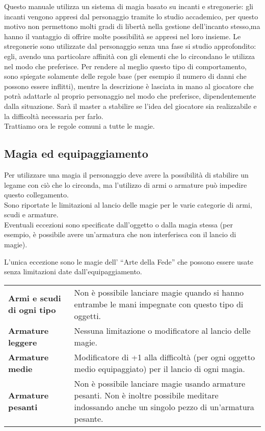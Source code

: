 \documentclass[../manuale_main.tex]{subfiles}
\begin{document}
Questo manuale utilizza un sistema di magia basato su incanti e stregonerie: gli incanti vengono appresi dal personaggio tramite lo studio accademico, per questo motivo non permettono molti gradi di libertà nella gestione dell'incanto stesso,ma hanno il vantaggio di offrire molte possibilità se appresi nel loro insieme. 
Le stregonerie sono utilizzate dal personaggio senza una fase si studio approfondito: egli, avendo una particolare affinità con gli elementi che lo circondano le utilizza nel modo che preferisce. Per rendere al meglio questo tipo di comportamento, sono spiegate solamente delle regole base (per esempio il numero di danni che possono essere inflitti), mentre la descrizione è lasciata in mano al giocatore che potrà adattarle al proprio personaggio nel modo che preferisce, dipendentemente dalla situazione. Sarà il master a stabilire se l'idea del giocatore sia realizzabile e la difficoltà necessaria per farlo.\\
Trattiamo ora le regole comuni a tutte le magie.\\


\subsection{Magia ed equipaggiamento}
Per utilizzare una magia il personaggio deve avere la possibilità di stabilire un legame con ciò che lo circonda, ma l'utilizzo di armi o armature può impedire questo collegamento.\\
Sono riportate le limitazioni al lancio delle magie per le varie categorie di armi, scudi e armature.\\
Eventuali eccezioni sono specificate dall'oggetto o dalla magia stessa (per esempio, è possibile avere un'armatura che non interferisca con il lancio di magie).

L'unica eccezione sono le magie dell' ``Arte della Fede'' che possono essere usate senza limitazioni date dall'equipaggiamento.
\renewcommand{\arraystretch}{1.5}
\begin{tabularx}{\linewidth}{l X}
\textbf{Armi e scudi di ogni tipo}&Non è possibile lanciare magie quando si hanno entrambe le mani impegnate con questo tipo di oggetti.\\
\textbf{Armature leggere}&Nessuna limitazione o modificatore al lancio delle magie.\\
\textbf{Armature medie}&Modificatore di +1 alla difficoltà (per ogni oggetto medio equipaggiato) per il lancio di ogni magia.\\
\textbf{Armature pesanti}&Non è possibile lanciare magie usando armature pesanti. Non è inoltre possibile meditare indossando anche un singolo pezzo di un'armatura pesante.\\
\end{tabularx}
\end{document}
